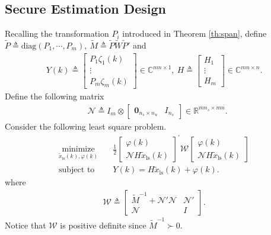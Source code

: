 \documentclass[12pt]{article}  %
\newcommand{\Rb}{{\mathbb{R}}}
\newcommand{\Cb}{{\mathbb{C}}}
\newcommand{\Nc}{{\mathcal{N}}}
\newcommand{\Wc}{{\mathcal{W}}}
\newcommand{\ls}{\text{ls}}
\begin{document}
\subsection{Secure Estimation Design}
Recalling the transformation $P_i$ introduced in Theorem \ref{th:span}, define $\tilde{P} \triangleq \text{diag}\left(P_1,\cdots,P_m\right),\ \tilde{M}\triangleq\tilde{P}\tilde{W}\tilde{P}{'}$ and
\begin{align}\label{eq:def_YH}
{Y} (k)\triangleq
\begin{bmatrix}
P_1\zeta_{1}(k) \\
\vdots \\
P_m\zeta_{m}(k)
\end{bmatrix}\in\Cb^{mn\times 1}, \
H\triangleq\begin{bmatrix}
H_{1} \\
\vdots \\
H_{m}
\end{bmatrix}\in\Cb^{mn\times n} .	
\end{align}
Define the following matrix
\begin{align*}
&\Nc\triangleq
I_{m} \otimes 
\begin{bmatrix}
\mathbf{0}_{n_s\times n_u} & I_{n_s}
\end{bmatrix}
\in \Rb^{mn_s\times mn }.
\end{align*}
Consider the following least square problem.
\begin{subequations}\label{pb:least_square}
	\begin{align}
	\underset{{\tilde{x}_\ls}(k), \varphi(k)}{\text{minimize}}&\quad \frac{1}{2} 
	\begin{bmatrix}
	\varphi(k) \\
	\Nc H \tilde{x}_\ls(k)
	\end{bmatrix}^{'} \Wc
	\begin{bmatrix}
	\varphi(k) \\
	\Nc H \tilde{x}_\ls(k)
	\end{bmatrix}  \\
	\text {subject to}&\quad
	{Y} (k)= H \tilde{x}_\ls(k)+\varphi(k).  
	\end{align}
\end{subequations}
where 
\begin{align}\label{eq:def_W}
\Wc\triangleq \begin{bmatrix}
\tilde{M}^{-1}+ \Nc{'}\Nc & \Nc{'} \\
\Nc &  I
\end{bmatrix}.
\end{align}
Notice that $\Wc$ is positive definite since $\tilde{M}^{-1}\succ 0$.
\end{document}
